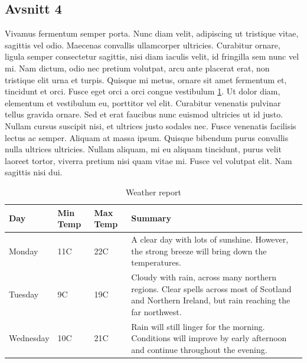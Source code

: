 \documentclass[12pt]{article}
\begin{document}
\subsection{Avsnitt 4}
\label{sec-1-2}
Vivamus fermentum semper porta. Nunc diam velit, adipiscing ut tristique vitae, sagittis vel odio. Maecenas convallis ullamcorper ultricies. Curabitur ornare, ligula semper consectetur sagittis, nisi diam iaculis velit, id fringilla sem nunc vel mi. Nam dictum, odio nec pretium volutpat, arcu ante placerat erat, non tristique elit urna et turpis. Quisque mi metus, ornare sit amet \citet{obt} fermentum et, tincidunt et orci. Fusce eget orci a orci congue vestibulum \ref{tab:weather}. Ut dolor diam, elementum et vestibulum eu, porttitor vel elit. Curabitur venenatis pulvinar tellus gravida ornare. Sed et erat faucibus nunc euismod ultricies ut id justo. Nullam cursus suscipit nisi, et ultrices justo sodales nec. Fusce venenatis facilisis lectus ac semper. Aliquam at massa ipsum. Quisque bibendum purus convallis nulla ultrices ultricies. Nullam aliquam, mi eu aliquam tincidunt, purus velit laoreet tortor, viverra pretium nisi quam vitae mi. Fusce vel volutpat elit. Nam sagittis nisi dui.




\begin{table}[htbp]
\begin{center}
     \begin{tabular}{ | l | l | l | p{5cm} |}
     \hline
     Day & Min Temp & Max Temp & Summary \\ \hline
     Monday & 11C & 22C & A clear day with lots of sunshine.
     However, the strong breeze will bring down the temperatures. \\ \hline
     Tuesday & 9C & 19C & Cloudy with rain, across many northern regions. Clear spells
     across most of Scotland and Northern Ireland,
     but rain reaching the far northwest. \\ \hline
     Wednesday & 10C & 21C & Rain will still linger for the morning.
     Conditions will improve by early afternoon and continue
     throughout the evening. \\
     \hline
     \end{tabular}
\end{center}
\caption{Weather report}
\label{tab:weather}
\end{table}



\clearpage


\end{document}
